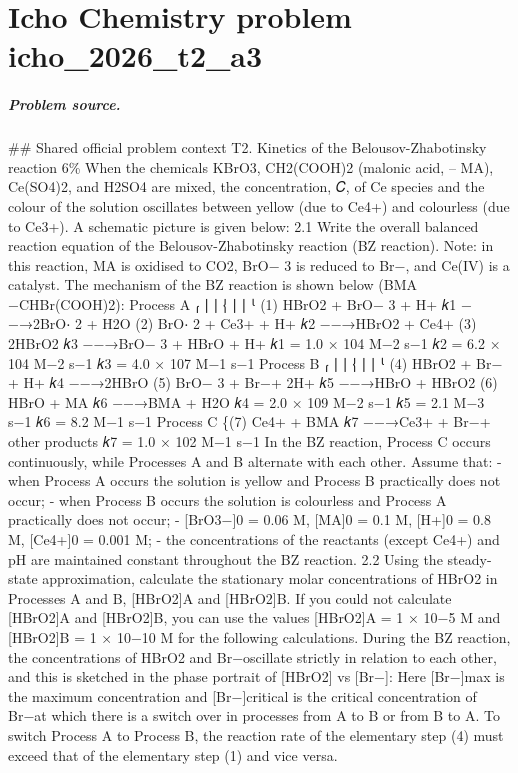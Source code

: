 
\chapter{Icho Chemistry problem icho\_2026\_t2\_a3}
\label{ch:IChO2026Problems_problem_icho_2026_t2_a3}

\paragraph{Problem source.}
\#\# Shared official problem context
T2. Kinetics of the Belousov-Zhabotinsky reaction 6\% When the chemicals KBrO3, CH2(COOH)2 (malonic acid, – MA), Ce(SO4)2, and H2SO4 are mixed, the concentration, 𝐶, of Ce species and the colour of the solution oscillates between yellow (due to Ce4+) and colourless (due to Ce3+). A schematic picture is given below: 2.1 Write the overall balanced reaction equation of the Belousov-Zhabotinsky reaction (BZ reaction). Note: in this reaction, MA is oxidised to CO2, BrO− 3 is reduced to Br−, and Ce(IV) is a catalyst. The mechanism of the BZ reaction is shown below (BMA −CHBr(COOH)2): Process A ⎧ ⎪ ⎪ ⎨ ⎪ ⎪ ⎩ (1) HBrO2 + BrO− 3 + H+ 𝑘1 −−→2BrO⋅ 2 + H2O (2) BrO⋅ 2 + Ce3+ + H+ 𝑘2 −−→HBrO2 + Ce4+ (3) 2HBrO2 𝑘3 −−→BrO− 3 + HBrO + H+ 𝑘1 = 1.0 × 104 M−2 s−1 𝑘2 = 6.2 × 104 M−2 s−1 𝑘3 = 4.0 × 107 M−1 s−1 Process B ⎧ ⎪ ⎪ ⎨ ⎪ ⎪ ⎩ (4) HBrO2 + Br−+ H+ 𝑘4 −−→2HBrO (5) BrO− 3 + Br−+ 2H+ 𝑘5 −−→HBrO + HBrO2 (6) HBrO + MA 𝑘6 −−→BMA + H2O 𝑘4 = 2.0 × 109 M−2 s−1 𝑘5 = 2.1 M−3 s−1 𝑘6 = 8.2 M−1 s−1 Process C \{(7) Ce4+ + BMA 𝑘7 −−→Ce3+ + Br−+ other products 𝑘7 = 1.0 × 102 M−1 s−1 In the BZ reaction, Process C occurs continuously, while Processes A and B alternate with each other. Assume that: - when Process A occurs the solution is yellow and Process B practically does not occur; - when Process B occurs the solution is colourless and Process A practically does not occur; - [BrO3−]0 = 0.06 M, [MA]0 = 0.1 M, [H+]0 = 0.8 M, [Ce4+]0 = 0.001 M; - the concentrations of the reactants (except Ce4+) and pH are maintained constant throughout the BZ reaction. 2.2 Using the steady-state approximation, calculate the stationary molar concentrations of HBrO2 in Processes A and B, [HBrO2]A and [HBrO2]B. If you could not calculate [HBrO2]A and [HBrO2]B, you can use the values [HBrO2]A = 1 × 10−5 M and [HBrO2]B = 1 × 10−10 M for the following calculations. During the BZ reaction, the concentrations of HBrO2 and Br−oscillate strictly in relation to each other, and this is sketched in the phase portrait of [HBrO2] vs [Br−]: Here [Br−]max is the maximum concentration and [Br−]critical is the critical concentration of Br−at which there is a switch over in processes from A to B or from B to A. To switch Process A to Process B, the reaction rate of the elementary step (4) must exceed that of the elementary step (1) and vice versa.

